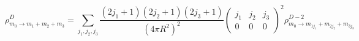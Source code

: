 \begin{equation}
\rho^D_{m_0\rightarrow m_1+m_2+m_3}\!=\!\!\!\!\sum_{j_1,j_2,j_3}\!\!\!
 \frac{(2j_1\!+\!1)(2j_2\!+\!1)(2j_3\!+\!1)}{(4\pi R^2)^2}\left(\!\!
 \begin{array}{ccc}j_1\!&\!j_2\!&\!j_3\\ 0\!&\!0\!&\!0\end{array}\!\!\right)^2
 \!\!\rho^{D-2}_{m_0\rightarrow m_{1j_1}\!+m_{2j_2}\!+m_{3j_3}}
\end{equation}

